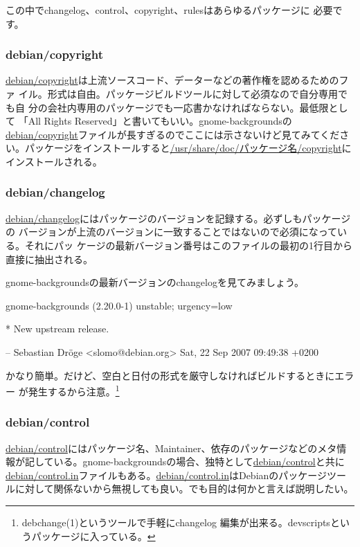 \documentclass[mingoth,a4paper]{jsarticle}
\begin{document}
この中でchangelog、control、copyright、rulesはあらゆるパッケージに
必要です。

\subsubsection{debian/copyright}

\url{debian/copyright}は上流ソースコード、データーなどの著作権を認めるためのファ
イル。形式は自由。パッケージビルドツールに対して必須なので自分専用でも自
分の会社内専用のパッケージでも一応書かなければならない。最低限として
「All Rights Reserved」と書いてもいい。gnome-backgroundsの
\url{debian/copyright}ファイルが長すぎるのでここには示さないけど見てみてくださ
い。パッケージをインストールすると\url{/usr/share/doc/パッケージ名/copyright}にインストールされる。

\subsubsection{debian/changelog}

\url{debian/changelog}にはパッケージのバージョンを記録する。必ずしもパッケージの
バージョンが上流のバージョンに一致することではないので必須になっている。それにパッ
ケージの最新バージョン番号はこのファイルの最初の1行目から直接に抽出される。

gnome-backgroundsの最新バージョンのchangelogを見てみましょう。
\begin{commandline}
gnome-backgrounds (2.20.0-1) unstable; urgency=low

  * New upstream release.

 -- Sebastian Dr\"oge <slomo@debian.org>  Sat, 22 Sep 2007 09:49:38 +0200
\end{commandline}

かなり簡単。だけど、空白と日付の形式を厳守しなければビルドするときにエラー
が発生するから注意。\footnote{debchange(1)というツールで手軽にchangelog
編集が出来る。devscriptsというパッケージに入っている。}

\subsubsection{debian/control}

\url{debian/control}にはパッケージ名、Maintainer、依存のパッケージなどのメタ情
報が記している。gnome-backgroundsの場合、独特として\url{debian/control}と共に
\url{debian/control.in}ファイルもある。\url{debian/control.in}はDebianのパッケージツー
ルに対して関係ないから無視しても良い。でも目的は何かと言えば説明したい。
\end{document}
